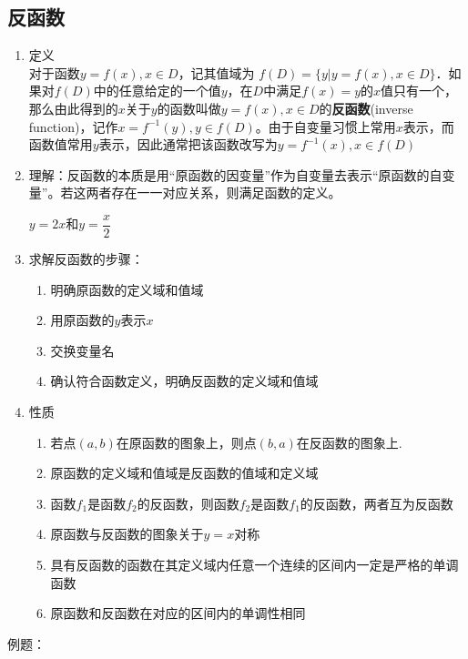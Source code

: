 \subsection*{反函数}
    \begin{enumerate}
        \item 定义 \\
        对于函数$y=f(x), x \in D$，记其值域为 $f(D)=\{y|y=f(x), x \in D\}$．如果对$f(D)$中的任意给定的一个值$y$，在$D$中满足$f(x) = y$的$x$值只有一个，那么由此得到的$x$关于$y$的函数叫做$y=f(x), x \in D$的\textbf{反函数}(inverse function)，记作$x = f^{-1}(y), y \in f(D)$。由于自变量习惯上常用$x$表示，而函数值常用$y$表示，因此通常把该函数改写为$y = f^{-1}(x), x \in f(D)$
        \item 理解：反函数的本质是用“原函数的因变量”作为自变量去表示“原函数的自变量”。若这两者存在一一对应关系，则满足函数的定义。
        \begin{example}
            $y = 2x$和$y = \dfrac{x}{2}$
        \end{example}
        \item 求解反函数的步骤：
        \begin{enumerate}
            \item 明确原函数的定义域和值域
            \item 用原函数的$y$表示$x$
            \item 交换变量名
            \item 确认符合函数定义，明确反函数的定义域和值域
        \end{enumerate}
        \item 性质
        \begin{enumerate}
            \item 若点$(a, b)$在原函数的图象上，则点$(b, a)$在反函数的图象上.
            \item 原函数的定义域和值域是反函数的值域和定义域
            \item 函数$f_1$是函数$f_2$的反函数，则函数$f_2$是函数$f_1$的反函数，两者互为反函数
            \item 原函数与反函数的图象关于$y=x$对称
            \item 具有反函数的函数在其定义域内任意一个连续的区间内一定是严格的单调函数
            \item 原函数和反函数在对应的区间内的单调性相同
        \end{enumerate}
    \end{enumerate}
    例题：
